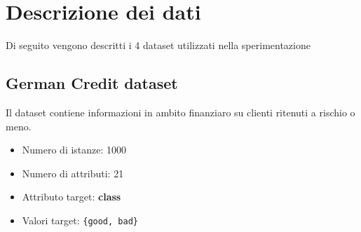 \chapter{Descrizione dei dati}
\label{ch:data}

Di seguito vengono descritti i 4 dataset utilizzati nella sperimentazione

\section{German Credit dataset}
Il dataset contiene informazioni in ambito finanziaro su clienti ritenuti a rischio o meno.


\begin{itemize}
	\item Numero di istanze: 1000
	\item Numero di attributi: 21
	\item Attributo target: \textbf{class}
	\item Valori target: \texttt{\{good, bad\}}
\end{itemize}

